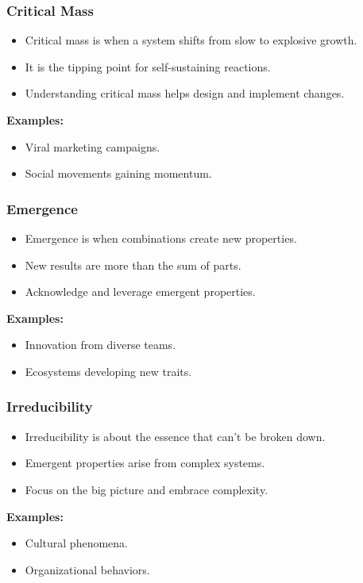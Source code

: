 \begin{frame}[fragile]\frametitle{Critical Mass}
\begin{itemize}
    \item Critical mass is when a system shifts from slow to explosive growth.
    \item It is the tipping point for self-sustaining reactions.
    \item Understanding critical mass helps design and implement changes.
\end{itemize}
\textbf{Examples:}
\begin{itemize}
    \item Viral marketing campaigns.
    \item Social movements gaining momentum.
\end{itemize}
\end{frame}

\begin{frame}[fragile]\frametitle{Emergence}
\begin{itemize}
    \item Emergence is when combinations create new properties.
    \item New results are more than the sum of parts.
    \item Acknowledge and leverage emergent properties.
\end{itemize}
\textbf{Examples:}
\begin{itemize}
    \item Innovation from diverse teams.
    \item Ecosystems developing new traits.
\end{itemize}
\end{frame}

\begin{frame}[fragile]\frametitle{Irreducibility}
\begin{itemize}
    \item Irreducibility is about the essence that can't be broken down.
    \item Emergent properties arise from complex systems.
    \item Focus on the big picture and embrace complexity.
\end{itemize}
\textbf{Examples:}
\begin{itemize}
    \item Cultural phenomena.
    \item Organizational behaviors.
\end{itemize}
\end{frame}

